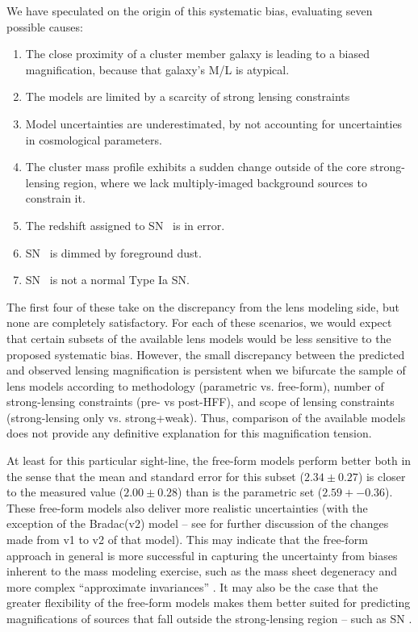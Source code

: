 We have speculated on the origin of this systematic bias,
evaluating seven possible causes: 

\begin{enumerate}
\item The close proximity of a cluster member galaxy is leading to a
biased magnification, because that galaxy's M/L is atypical.
\item The models are limited by a scarcity of strong lensing constraints
\item Model uncertainties are underestimated, by not accounting for 
       uncertainties in cosmological parameters.
\item The cluster mass profile exhibits a sudden change outside of the core
strong-lensing region, where we lack multiply-imaged background
sources to constrain it.
\item The redshift assigned to SN \tomas\ is in error.
\item SN \tomas\ is dimmed by foreground dust.
\item SN \tomas\ is not a normal Type Ia SN.
\end{enumerate}

\noindent The first four of these take on the discrepancy from 
the lens modeling side, but none are completely satisfactory. For each
of these scenarios, we would expect that certain subsets of the
available lens models would be less sensitive to the proposed
systematic bias.  However, the small discrepancy between the predicted
and observed lensing magnification is persistent when we bifurcate the
sample of lens models according to methodology (parametric
vs. free-form), number of strong-lensing constraints (pre- vs
post-HFF), and scope of lensing constraints (strong-lensing only
vs. strong+weak). Thus, comparison of the available models does not
provide any definitive explanation for this magnification tension.

At least for this particular sight-line, the free-form models perform
better both in the sense that the mean and standard error for this
subset ($2.34\pm0.27$) is closer to the measured value ($2.00\pm0.28$)
than is the parametric set ($2.59 +- 0.36$).  These free-form models
also deliver more realistic uncertainties (with the exception of the
Bradac(v2) model -- see \citet{Wang:2015} for further discussion of
the changes made from v1 to v2 of that model).  This may indicate that
the free-form approach in general is more successful in capturing the
uncertainty from biases inherent to the mass modeling exercise, such
as the mass sheet degeneracy and more complex ``approximate
invariances'' \citep{Liesenborgs:2012,Schneider:2014}.  It may also be
the case that the greater flexibility of the free-form models makes
them better suited for predicting magnifications of sources that fall
outside the strong-lensing region -- such as SN \tomas. 

